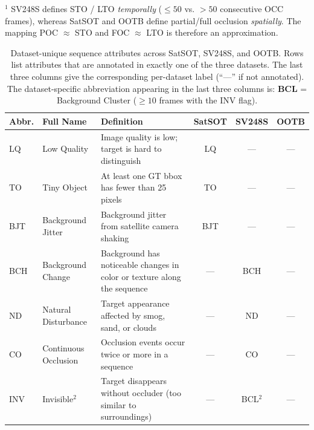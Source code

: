 \begin{table}[t]
\vspace{2pt}
\begin{flushleft}\footnotesize
$^{1}$ SV248S defines STO / LTO \emph{temporally} ($\leq 50$ vs. $>50$ consecutive OCC frames),
whereas SatSOT and OOTB define partial/full occlusion \emph{spatially}. The mapping
POC $\approx$ STO and FOC $\approx$ LTO is therefore an approximation.
\end{flushleft}
\end{table}


\begin{table}[t]
\centering
\caption{Dataset-unique sequence attributes across SatSOT, SV248S, and OOTB.
Rows list attributes that are annotated in exactly one of the three datasets.
The last three columns give the corresponding per-dataset label
(``---'' if not annotated).
The dataset-specific abbreviation appearing in the last three columns is:
\textbf{BCL} = Background Cluster ($\geq 10$ frames with the INV flag).}
\label{tab:unique_attributes}
\small
\setlength{\tabcolsep}{4pt}
\renewcommand{\arraystretch}{1.15}
\begin{tabular}{llp{7.4cm}ccc}
\toprule
\textbf{Abbr.} & \textbf{Full Name} & \textbf{Definition} & \textbf{SatSOT} & \textbf{SV248S} & \textbf{OOTB} \\
\midrule
LQ   & Low Quality             & Image quality is low; target is hard to distinguish                      & LQ  & --- & --- \\
TO   & Tiny Object             & At least one GT bbox has fewer than 25 pixels                            & TO  & --- & --- \\
BJT  & Background Jitter       & Background jitter from satellite camera shaking                          & BJT & --- & --- \\
BCH  & Background Change       & Background has noticeable changes in color or texture along the sequence & --- & BCH & --- \\
ND   & Natural Disturbance     & Target appearance affected by smog, sand, or clouds                      & --- & ND  & --- \\
CO   & Continuous Occlusion    & Occlusion events occur twice or more in a sequence                       & --- & CO  & --- \\
INV  & Invisible$^{2}$         & Target disappears without occluder (too similar to surroundings)         & --- & BCL$^{2}$ & --- \\

\end{tabular}
\end{table}
